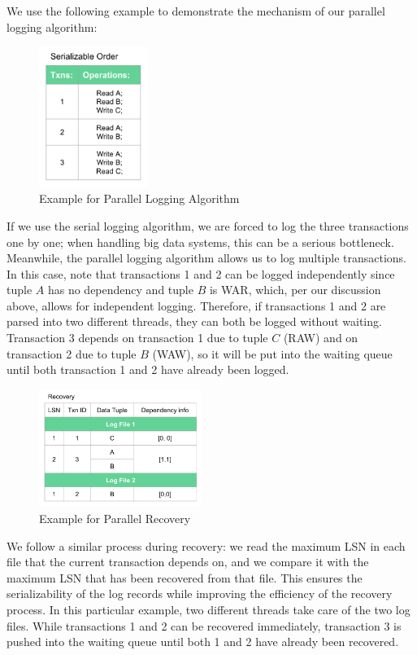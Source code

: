 We use the following example to demonstrate the mechanism of our parallel logging algorithm: 
\begin{figure}[!h]
\caption{Example for Parallel Logging Algorithm}
\centering
\includegraphics[width=100pt]{Parallel.png}
\end{figure}\par
If we use the serial logging algorithm, we are forced to log the three transactions one by one; when handling big data systems, this can be a serious bottleneck. Meanwhile, the parallel logging algorithm allows us to log multiple transactions. In this case, note that transactions 1 and 2 can be logged independently since tuple $A$ has no dependency and tuple $B$ is WAR, which, per our discussion above, allows for independent logging. Therefore, if transactions 1 and 2 are parsed into two different threads, they can both be logged without waiting. Transaction 3 depends on transaction 1 due to tuple $C$ (RAW) and on transaction 2 due to tuple $B$ (WAW), so it will be put into the waiting queue until both transaction 1 and 2 have already been logged. 
\begin{figure}[!h]
\caption{Example for Parallel Recovery}
\centering
\includegraphics[width=150pt]{Parallel_re.png}
\end{figure}\par
We follow a similar process during recovery: we read the maximum LSN in each file that the current transaction depends on, and we compare it with the maximum LSN that has been recovered from that file. This ensures the serializability of the log records while improving the efficiency of the recovery process. In this particular example, two different threads take care of the two log files. While transactions 1 and 2 can be recovered immediately, transaction 3 is pushed into the waiting queue until both 1 and 2 have already been recovered.\par
